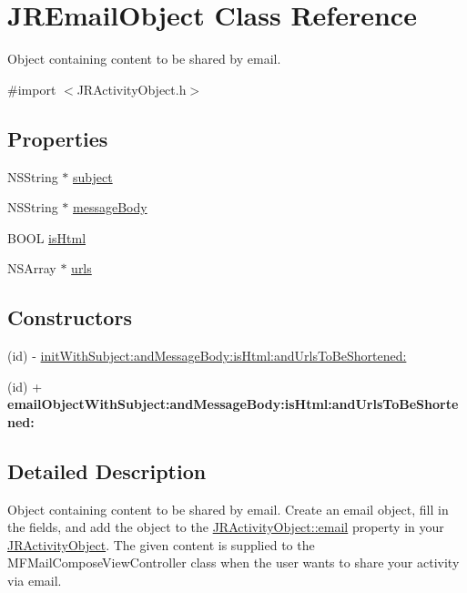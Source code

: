 \hypertarget{interface_j_r_email_object}{
\section{JREmailObject Class Reference}
\label{interface_j_r_email_object}
}


Object containing content to be shared by email.  




{\ttfamily \#import $<$JRActivityObject.h$>$}

\subsection*{Properties}
\begin{DoxyCompactItemize}
\item 
NSString $\ast$ \hyperlink{interface_j_r_email_object_a618a23c34ede4a4eb56ed6cf05d91b64}{subject}
\item 
NSString $\ast$ \hyperlink{interface_j_r_email_object_ad0e6a07cb2aec3cf6eee75d2ace32e7d}{messageBody}
\item 
BOOL \hyperlink{interface_j_r_email_object_af372942f67fba5e93fb2b53f4ee8a3c5}{isHtml}
\item 
NSArray $\ast$ \hyperlink{interface_j_r_email_object_a3f274a24ce4145b46cb5f0cda50378ce}{urls}
\end{DoxyCompactItemize}
\subsection*{Constructors}
\label{_amgrp559a25fdb98a7d1fd1c3771ac568d5e9}
 \begin{DoxyCompactItemize}
\item 
(id) -\/ \hyperlink{interface_j_r_email_object_aa911e84f7b1f7e8c4fd15009dbdc6783}{initWithSubject:andMessageBody:isHtml:andUrlsToBeShortened:}
\item 
\hypertarget{interface_j_r_email_object_aea1535d69b58d30295e5b88f93d0a474}{
(id) + {\bfseries emailObjectWithSubject:andMessageBody:isHtml:andUrlsToBeShortened:}}
\label{interface_j_r_email_object_aea1535d69b58d30295e5b88f93d0a474}

\end{DoxyCompactItemize}


\subsection{Detailed Description}
Object containing content to be shared by email. Create an email object, fill in the fields, and add the object to the \hyperlink{interface_j_r_activity_object_aa26818070a5987c70ef14700d6f6c72c}{JRActivityObject::email} property in your \hyperlink{interface_j_r_activity_object}{JRActivityObject}. The given content is supplied to the MFMailComposeViewController class when the user wants to share your activity via email.

